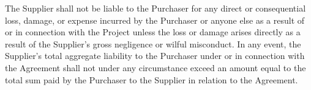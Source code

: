 \documentclass[nz-terms]{subfiles}
\begin{document}
The Supplier shall not be liable to the Purchaser for any direct or
consequential loss, damage, or expense incurred by the Purchaser or anyone else
as a result of or in connection with the Project unless the loss or damage
arises directly as a result of the Supplier's gross negligence or wilful
misconduct. In any event, the Supplier's total aggregate liability to the
Purchaser under or in connection with the Agreement shall not under any
circumstance exceed an amount equal to the total sum paid by the Purchaser to
the Supplier in relation to the Agreement.
\end{document}
